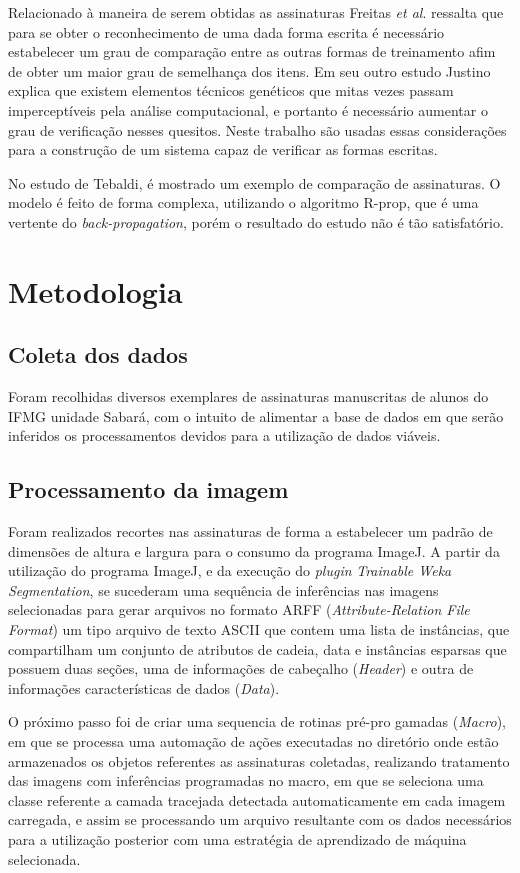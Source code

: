 \documentclass[12pt]{article}
\begin{document}
			Relacionado à maneira de serem obtidas as assinaturas Freitas \textit{et al}.\cite{freitas2003} ressalta que para se obter o reconhecimento de uma dada forma escrita é necessário estabelecer um grau de comparação entre as outras formas de treinamento afim de obter um maior grau de semelhança dos itens. Em seu outro estudo Justino\cite{justino2001} explica que existem elementos técnicos genéticos que mitas vezes passam imperceptíveis pela análise computacional, e portanto é necessário aumentar o grau de verificação nesses quesitos. Neste trabalho são usadas essas considerações para a construção de um sistema capaz de verificar as formas escritas. 
			
			No estudo de Tebaldi\cite{tebaldi2007}, é mostrado um exemplo de comparação de assinaturas. O modelo é feito de forma complexa, utilizando o algoritmo R-prop, que é uma vertente do \textit{back-propagation}, porém o resultado do estudo não é tão satisfatório.

	\section{Metodologia}
		\subsection{Coleta dos dados}
			Foram recolhidas diversos exemplares de assinaturas manuscritas de alunos do IFMG unidade Sabará, com o intuito de alimentar a base de dados em que serão inferidos os processamentos devidos para a utilização de dados viáveis.
				
		\subsection{Processamento da imagem}
		    Foram realizados recortes nas assinaturas de forma a estabelecer um padrão de dimensões de altura e largura para o consumo da programa ImageJ.	A partir da utilização do programa ImageJ, e da execução do \textit{plugin} \textit{Trainable Weka Segmentation}, se sucederam uma sequência de inferências nas imagens selecionadas para gerar arquivos no formato ARFF (\textit{Attribute-Relation File Format}) um tipo arquivo de texto ASCII que contem uma lista de instâncias, que compartilham um conjunto de atributos de cadeia, data e instâncias esparsas que possuem duas seções, uma de informações de cabeçalho (\textit{Header}) e outra de informações características de dados (\textit{Data}).
			
			O próximo passo foi de criar uma sequencia de rotinas pré-pro gamadas (\textit{Macro}), em que se processa uma automação de ações executadas no diretório onde estão armazenados os objetos referentes as assinaturas coletadas, realizando tratamento das imagens com inferências programadas no macro, em que se seleciona uma classe referente a camada tracejada detectada automaticamente em cada imagem carregada, e assim se processando um arquivo resultante com os dados necessários para a utilização posterior com uma estratégia de aprendizado de máquina selecionada.
			
\end{document}
